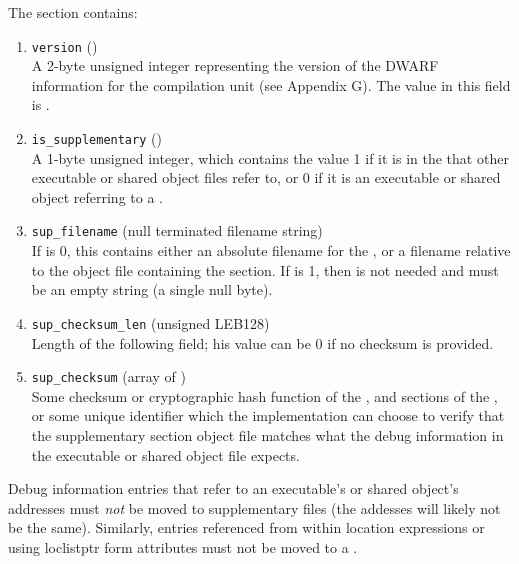 The \dotdebugsup{} section contains:
\begin{enumerate}[1. ]
\item \texttt{version} (\HFTuhalf) \\
A 2-byte unsigned integer representing the version of the DWARF
information for the compilation unit (see Appendix G). The
value in this field is \versiondotdebugsup.

\item \texttt{is\_supplementary} (\HFTubyte) \\
A 1-byte unsigned integer, which contains the value 1 if it is
in the  that other executable or 
shared object files refer to, or 0 if it is an executable or shared object 
referring to a .

\item \texttt{sup\_filename} (null terminated filename string) \\
If  is 0, this contains either an absolute 
filename for the , or a filename 
relative to the object file containing the \dotdebugsup{} section.  
If  is 1, then 
is not needed and must be an empty string (a single null byte).

\item \texttt{sup\_checksum\_len} (unsigned LEB128) \\
Length of the following  field; 
his value can be 0 if no checksum is provided.


\item \texttt{sup\_checksum} (array of \HFTubyte) \\
Some checksum or cryptographic hash function of the \dotdebuginfo{}, 
\dotdebugstr{} and \dotdebugmacro{} sections of the 
, or some unique identifier
which the implementation can choose to verify that the supplementary 
section object file matches what the debug information in the executable 
or shared object file expects.
\end{enumerate}

Debug information entries that refer to an executable's or shared
object's addresses must \emph{not} be moved to supplementary files (the
addesses will likely not be the same). Similarly,
entries referenced from within location expressions or using loclistptr
form attributes must not be moved to a .

